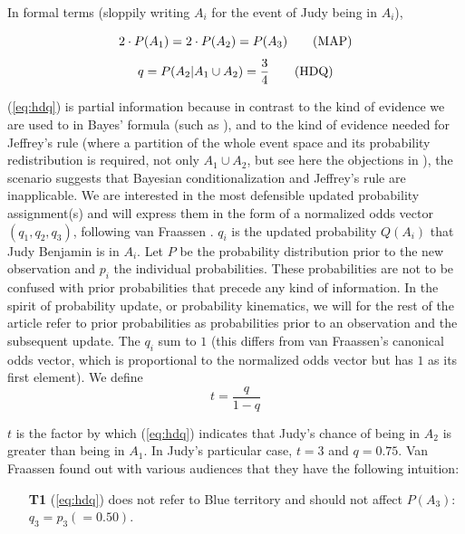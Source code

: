 \documentclass[12pt]{article}
\begin{document}
\nial In formal terms (sloppily writing $A_{i}$ for the event of Judy
being in $A_{i}$),

\begin{equation}
  \label{eq:map}
  2\cdot{}P(A_{1})=2\cdot{}P(A_{2})=P(A_{3})\tag{\mbox{MAP}}
\end{equation}
\begin{equation}
  \label{eq:hdq}
  q=P(A_{2}|A_{1}\cup{}A_{2})=\frac{3}{4}\tag{\mbox{HDQ}}
\end{equation}

\nial ({\ref{eq:hdq}}) is partial information because in contrast to
the kind of evidence we are used to in Bayes' formula (such as
), and to the kind of evidence needed
for Jeffrey's rule (where a partition of the whole event space and its
probability redistribution is required, not only $A_{1}\cup{}A_{2}$,
but see here the objections in ), the
scenario suggests that Bayesian conditionalization and Jeffrey's rule
are inapplicable. We are interested in the most defensible updated
probability assignment(s) and will express them in the form of a
normalized odds vector $(q_{1},q_{2},q_{3})$, following van Fraassen
. $q_{i}$ is the updated probability $Q(A_{i})$
that Judy Benjamin is in $A_{i}$. Let $P$ be the probability
distribution prior to the new observation and $p_{i}$ the individual
 probabilities. These probabilities are not to be
confused with prior probabilities that precede any kind of
information. In the spirit of probability update, or probability
kinematics, we will for the rest of the article refer to prior
probabilities as probabilities prior to an observation and the
subsequent update. The $q_{i}$ sum to $1$ (this differs from van
Fraassen's canonical odds vector, which is proportional to the
normalized odds vector but has $1$ as its first element). We define
\begin{displaymath}
  t=\frac{q}{1-q}
\end{displaymath}

\nial $t$ is the factor by which ({\ref{eq:hdq}}) indicates that
Judy's chance of being in $A_{2}$ is greater than being in $A_{1}$. In
Judy's particular case, $t=3$ and $q=0.75$. Van Fraassen found out
with various audiences that they have the following intuition:

\begin{enumerate}
  \item[\textbf{T1}] ({\ref{eq:hdq}}) does not refer to Blue territory and
  should not affect $P(A_{3})$: $q_{3}=p_{3}(=0.50)$.
\end{enumerate}
\end{document}
